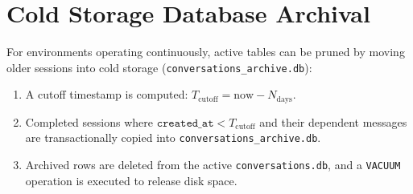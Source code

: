 \section{Cold Storage Database Archival}
For environments operating continuously, active tables can be pruned by moving older sessions into cold storage (\texttt{conversations\_archive.db}):
\begin{enumerate}
    \item A cutoff timestamp is computed: $T_{\text{cutoff}} = \text{now} - N_{\text{days}}$.
    \item Completed sessions where $\texttt{created\_at} < T_{\text{cutoff}}$ and their dependent messages are transactionally copied into \texttt{conversations\_archive.db}.
    \item Archived rows are deleted from the active \texttt{conversations.db}, and a \texttt{VACUUM} operation is executed to release disk space.
\end{enumerate}

